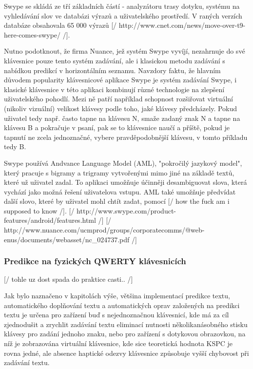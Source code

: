 \documentclass{article}
\begin{document}
Swype se skládá ze tří základních částí - analyzátoru trasy dotyku, systému na vyhledávání slov ve databázi výrazů a uživatelského prostředí. V raných verzích databáze obsahovala 65 000 výrazů [/ http://www.cnet.com/news/move-over-t9-here-comes-swype/ /]. %

Nutno podotknout, že firma Nuance, jež systém Swype vyvíjí, nezahrnuje do své klávesnice pouze tento systém zadávání, ale i klasickou metodu zadávání s nabídkou predikcí v horizontálním seznamu. Navzdory faktu, že hlavním důvodem popularity klávesnicové aplikace Swype je systém zadávání Swype, i klasické klávesnice v této aplikaci kombinují různé technologie na zlepšení uživatelského pohodlí. Mezi ně patří například schopnost rozšiřovat virtuální (nikoliv vizuální) velikost klávesy podle toho, jaké klávesy předcházely. Pokud uživatel tedy např. často tapne na klávesu N, smaže zadaný znak N a tapne na klávesu B a pokračuje v psaní, pak se to klávesnice naučí a příště, pokud je tapnutí ne zcela jednoznačné, vybere pravděpodobnější klávesu, v tomto příkladu tedy B. 

Swype používá Andvance Language Model (AML), "pokročilý jazykový model", který pracuje s bigramy a trigramy vytvořenými mimo jiné na základě textů, které už uživatel zadal. To aplikaci umožňuje účinněji desambiguovat slova, která vychází jako možná řešení uživatelova vstupu. AML také umožňuje předvídat další slovo, které by uživatel mohl chtít zadat, pomocí [/ how the fuck am i supposed to know /]. [/ http://www.swype.com/product-features/android/features.html /] [/ http://www.nuance.com/ucmprod/groups/corporatecomms/@web-enus/documents/webasset/nc\_024737.pdf /]

\subsubsection{Predikce na fyzických QWERTY klávesnicích}

[/ tohle uz dost spada do praktice casti.. /]

Jak bylo naznačeno v kapitolách výše, většina implementací predikce textu, automatického doplňování textu a automatických oprav založených na predikci textu je určena pro zařízení buď s nejednoznačnou klávesnicí, kde má za cíl zjednodušit a zrychlit zadávání textu eliminací nutnosti několikanásobného stisku klávesy pro zadání jednoho znaku, nebo pro zařízení s dotykovou obrazovkou, na níž je zobrazována virtuální klávesnice, kde sice teoretická hodnota KSPC je rovna jedné, ale absence haptické odezvy klávesnice způsobuje vyšší chybovost při zadávání textu. 
\end{document}
